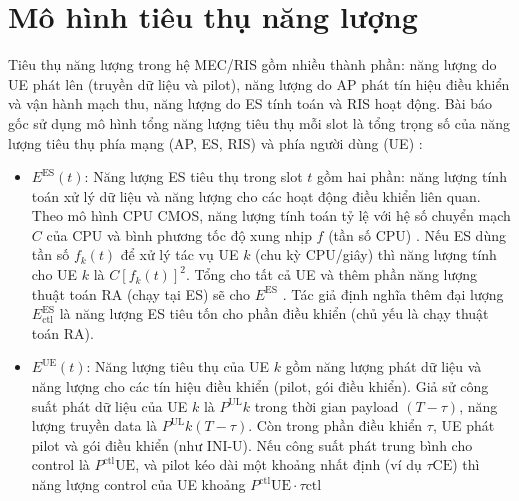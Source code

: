 \section{Mô hình tiêu thụ năng lượng}

Tiêu thụ năng lượng trong hệ MEC/RIS gồm nhiều thành phần: năng lượng do UE phát lên (truyền dữ liệu và pilot), năng lượng do AP phát tín hiệu điều khiển và vận hành mạch thu, năng lượng do ES tính toán và RIS hoạt động. Bài báo gốc sử dụng mô hình tổng năng lượng tiêu thụ mỗi slot là tổng trọng số của năng lượng tiêu thụ phía mạng (AP, ES, RIS) và phía người dùng (UE) :

\begin{itemize}
    \item $E^\text{ES}(t)$: Năng lượng ES tiêu thụ trong slot $t$ gồm hai phần: năng lượng tính toán xử lý dữ liệu và năng lượng cho các hoạt động điều khiển liên quan. Theo mô hình CPU CMOS, năng lượng tính toán tỷ lệ với hệ số chuyển mạch $C$ của CPU và bình phương tốc độ xung nhịp $f$ (tần số CPU)
. Nếu ES dùng tần số $f_k(t)$ để xử lý tác vụ UE $k$ (chu kỳ CPU/giây) thì năng lượng tính cho UE $k$ là $C [f_k(t)]^2$. Tổng cho tất cả UE và thêm phần năng lượng thuật toán RA (chạy tại ES) sẽ cho $E^\text{ES}$
\cite{ris_latency}
. Tác giả định nghĩa thêm đại lượng $E^\text{ES}_\text{ctl}$ là năng lượng ES tiêu tốn cho phần điều khiển (chủ yếu là chạy thuật toán RA).
    \item $E^\text{UE}(t)$: Năng lượng tiêu thụ của UE $k$ gồm năng lượng phát dữ liệu và năng lượng cho các tín hiệu điều khiển (pilot, gói điều khiển). Giả sử công suất phát dữ liệu của UE $k$ là $P^\text{UL}k$ trong thời gian payload $(T-\tau)$, năng lượng truyền data là $P^\text{UL}k (T-\tau)$. Còn trong phần điều khiển $\tau$, UE phát pilot và gói điều khiển (như INI-U). Nếu công suất phát trung bình cho control là $P^\text{ctl}\text{UE}$, và pilot kéo dài một khoảng nhất định (ví dụ $\tau\text{CE}$) thì năng lượng control của UE khoảng $P^\text{ctl}\text{UE} \cdot \tau\text{ctl}$


\end{itemize}

